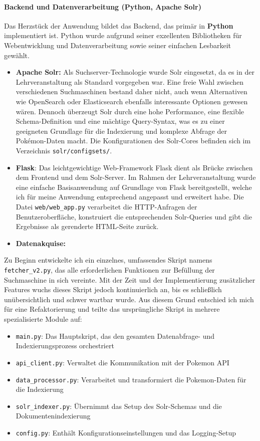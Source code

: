 \paragraph{Backend und Datenverarbeitung (Python, Apache Solr)}
Das Herzstück der Anwendung bildet das Backend, das primär in \textbf{Python} implementiert ist. Python wurde aufgrund seiner exzellenten Bibliotheken für Webentwicklung und Datenverarbeitung sowie seiner einfachen Lesbarkeit gewählt.
\begin{itemize}
    \item \textbf{Apache Solr:} Als Suchserver-Technologie wurde Solr eingesetzt, da es in der Lehrveranstaltung als Standard vorgegeben war. Eine freie Wahl zwischen verschiedenen Suchmaschinen bestand daher nicht, auch wenn Alternativen wie OpenSearch oder Elasticsearch ebenfalls interessante Optionen gewesen wären. Dennoch überzeugt Solr durch eine hohe Performance, eine flexible Schema-Definition und eine mächtige Query-Syntax, was es zu einer geeigneten Grundlage für die Indexierung und komplexe Abfrage der Pokémon-Daten macht. Die Konfigurationen des Solr-Cores befinden sich im Verzeichnis \texttt{solr/configsets/}.
    
    \item \textbf{Flask}: Das leichtgewichtige Web-Framework Flask dient als Brücke zwischen dem Frontend und dem Solr-Server. Im Rahmen der Lehrveranstaltung wurde eine einfache Basisanwendung auf Grundlage von Flask bereitgestellt, welche ich für meine Anwendung entsprechend angepasst und erweitert habe. Die Datei \texttt{web/web\_app.py} verarbeitet die HTTP-Anfragen der Benutzeroberfläche, konstruiert die entsprechenden Solr-Queries und gibt die Ergebnisse als gerenderte HTML-Seite zurück.
    
    \item \textbf{Datenakquise:}
\end{itemize}
Zu Beginn entwickelte ich ein einzelnes, umfassendes Skript namens \texttt{fetcher\_v2.py}, das alle erforderlichen Funktionen zur Befüllung der Suchmaschine in sich vereinte. Mit der Zeit und der Implementierung zusätzlicher Features wuchs dieses Skript jedoch kontinuierlich an, bis es schließlich unübersichtlich und schwer wartbar wurde. Aus diesem Grund entschied ich mich für eine Refaktorierung und teilte das ursprüngliche Skript in mehrere spezialisierte Module auf:

\begin{itemize} \item \texttt{main.py}: Das Hauptskript, das den gesamten Datenabfrage- und Indexierungsprozess orchestriert \item \texttt{api\_client.py}: Verwaltet die Kommunikation mit der Pokemon API
\item \texttt{data\_processor.py}: Verarbeitet und transformiert die Pokemon-Daten für die Indexierung \item \texttt{solr\_indexer.py}: Übernimmt das Setup des Solr-Schemas und die Dokumentenindexierung \item \texttt{config.py}: Enthält Konfigurationseinstellungen und das Logging-Setup \end{itemize}

